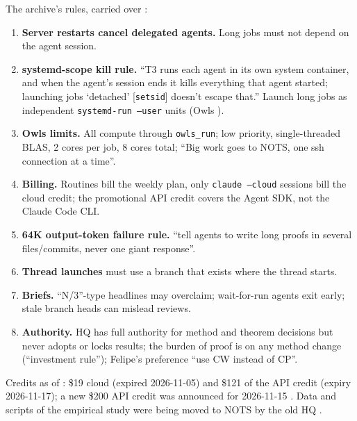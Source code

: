 The archive's rules, carried over :
\begin{enumerate}[leftmargin=1.5em]
\item \textbf{Server restarts cancel delegated agents.} Long jobs must not depend on the agent session.
\item \textbf{systemd-scope kill rule.} ``T3 runs each agent in its own system container, and when the agent's session ends it kills everything that agent started; launching jobs `detached' [\texttt{setsid}] doesn't escape that.'' Launch long jobs as independent \texttt{systemd-run --user} units (Owls ).
\item \textbf{Owls limits.} All compute through \texttt{owls\_run}; low priority, single-threaded BLAS, 2 cores per job, 8 cores total; ``Big work goes to NOTS, one ssh connection at a time''.
\item \textbf{Billing.} Routines bill the weekly plan, only \texttt{claude --cloud} sessions bill the cloud credit; the promotional API credit covers the Agent SDK, not the Claude Code CLI.
\item \textbf{64K output-token failure rule.} ``tell agents to write long proofs in several files/commits, never one giant response''.
\item \textbf{Thread launches} must use a branch that exists where the thread starts.
\item \textbf{Briefs.} ``N/3''-type headlines may overclaim; wait-for-run agents exit early; stale branch heads can mislead reviews.
\item \textbf{Authority.} HQ has full authority for method and theorem decisions  but never adopts or locks results; the burden of proof is on any method change (``investment rule''); Felipe's preference ``use CW instead of CP''.
\end{enumerate}
Credits as of : \$19 cloud (expired 2026-11-05) and \$121 of the API credit (expiry 2026-11-17); a new \$200 API credit was announced for 2026-11-15 . Data and scripts of the empirical study were being moved to NOTS  by the old HQ .

